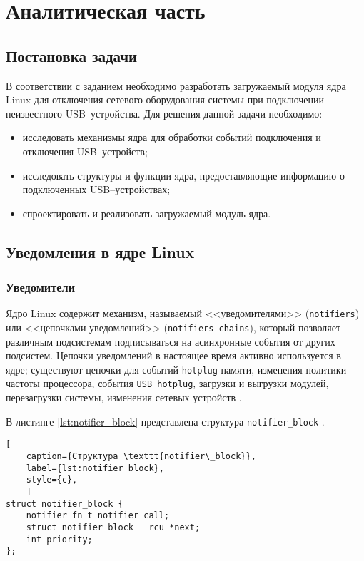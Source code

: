 \chapter{Аналитическая часть}

\section{Постановка задачи}

В соответствии с заданием необходимо разработать загружаемый модуля ядра Linux для отключения сетевого оборудования системы при подключении неизвестного USB--устройства. Для решения данной задачи необходимо:
\begin{itemize}
	\item исследовать механизмы ядра для обработки событий подключения и отключения USB--устройств;
	\item исследовать структуры и функции ядра, предоставляющие информацию о подключенных USB--устройствах;
	\item спроектировать и реализовать загружаемый модуль ядра.
\end{itemize}

\section{Уведомления в ядре Linux}

\subsection{Уведомители}

Ядро Linux содержит механизм, называемый <<уведомителями>> (\texttt{notifiers}) или <<цепочками уведомлений>> (\texttt{notifiers chains}), который позволяет различным подсистемам подписываться на асинхронные события от других подсистем. Цепочки уведомлений в настоящее время активно используется в ядре; существуют цепочки для событий \texttt{hotplug} памяти, изменения политики частоты процессора, события \texttt{USB hotplug}, загрузки и выгрузки модулей, перезагрузки системы, изменения сетевых устройств \cite{notifications}.

В листинге \ref{lst:notifier_block} представлена структура \texttt{notifier\_block} \cite{notifier_block}.

\begin{lstlisting}[
	caption={Структура \texttt{notifier\_block}},
	label={lst:notifier_block},
	style={c},
	]
struct notifier_block {
	notifier_fn_t notifier_call;
	struct notifier_block __rcu *next;
	int priority;
};
\end{lstlisting}

